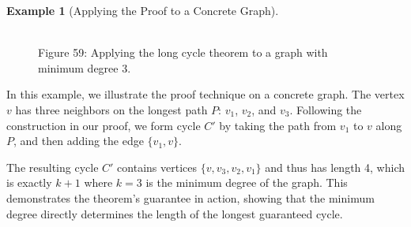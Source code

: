\documentclass{article}
\theoremstyle{definition}
\newtheorem{example}{Example}
\begin{document}
\begin{example}[Applying the Proof to a Concrete Graph]
\begin{figure}[h]
\centering
{}
\\
\small
Figure 59: Applying the long cycle theorem to a graph with minimum degree 3.
\label{fig:long-cycle-example}
\end{figure}

In this example, we illustrate the proof technique on a concrete graph. The vertex $v$ has three neighbors on the longest path $P$: $v_1$, $v_2$, and $v_3$. Following the construction in our proof, we form cycle $C'$ by taking the path from $v_1$ to $v$ along $P$, and then adding the edge $\{v_1, v\}$.

The resulting cycle $C'$ contains vertices $\{v, v_3, v_2, v_1\}$ and thus has length 4, which is exactly $k+1$ where $k=3$ is the minimum degree of the graph. This demonstrates the theorem's guarantee in action, showing that the minimum degree directly determines the length of the longest guaranteed cycle.
\end{example}
\end{document}
